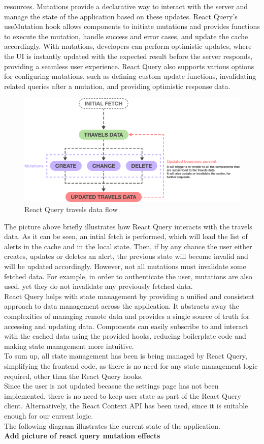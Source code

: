 \documentclass[./memory.tex]{subfiles}
\begin{document}
resources. Mutations provide a declarative way to interact with the server and
manage the state of the application based on these updates. React Query's
useMutation hook allows components to initiate mutations and provides functions
to execute the mutation, handle success and error cases, and update the cache
accordingly. With mutations, developers can perform optimistic updates, where
the UI is instantly updated with the expected result before the server responds,
providing a seamless user experience. React Query also supports various options
for configuring mutations, such as defining custom update functions,
invalidating related queries after a mutation, and providing optimistic response
data.
\begin{figure}[H]
	\centering
	\includegraphics[width=\textwidth]{./assets/react-query-travels.png}
	\caption{React Query travels data flow}
\end{figure}
The picture above briefly illustrates how React Query interacts with the travels
data. As it can be seen, an intial fetch is performed, which will load the list
of alerts in the cache and in the local state. Then, if by any chance the user
either creates, updates or deletes an alert, the previous state will become
invalid and will be updated accordingly. However, not all mutations must
invalidate some fetched data. For example, in order to authenticate the user,
mutations are also used, yet they do not invalidate any previously fetched data.
\\[8pt]
React Query helps with state management by providing a unified and consistent
approach to data management across the application. It abstracts away the
complexities of managing remote data and provides a single source of truth for
accessing and updating data. Components can easily subscribe to and interact
with the cached data using the provided hooks, reducing boilerplate code and
making state management more intuitive.
\\[8pt]
To sum up, all state management has been is being managed by React Query,
simplifying the frontend code, as there is no need for any state management
logic required, other than the React Query hooks.
\\
Since the user is not updated becasue the settings page has not been
implemented, there is no need to keep user state as part of the React Query
client. Alternatively, the React Context API has been used, since it is suitable
enough for our current logic.
\\
The following diagram illustrates the current state of the application.
\\[8pt]
\textbf{Add picture of react query mutation effects}
\end{document}
